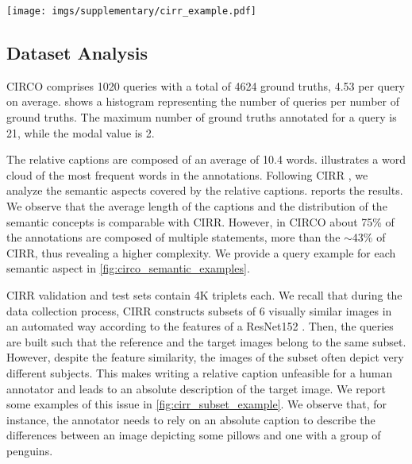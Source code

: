 \documentclass[10pt,twocolumn,letterpaper]{article}
\begin{document}
\begin{figure*}
     \centering
     \texttt{[image: imgs/supplementary/cirr\_example.pdf]}
     \caption{Examples of queries belonging to the CIRR dataset \cite{liu2021image}. The subsets of images depict very different subjects and the relative captions do not consider the reference images. We highlight the target image with a green border.}
     \label{fig:cirr_subset_example}
 \end{figure*}


\subsection{Dataset Analysis} \label{sec:dataset_analysis}
CIRCO comprises 1020 queries with a total of 4624 ground truths, 4.53 per query on average.  shows a histogram representing the number of queries per number of ground truths. The maximum number of ground truths annotated for a query is 21, while the modal value is 2. 

The relative captions are composed of an average of 10.4 words.
 illustrates a word cloud of the most frequent words in the annotations. Following CIRR \cite{liu2021image}, we analyze the semantic aspects covered by the relative captions.  reports the results. We observe that the average length of the captions and the distribution of the semantic concepts is comparable with CIRR. However, in CIRCO about 75\% of the annotations are composed of multiple statements, more than the $\sim$43\% of CIRR, thus revealing a higher complexity. We provide a query example for each semantic aspect in \cref{fig:circo_semantic_examples}.

CIRR \cite{liu2021image} validation and test sets contain 4K triplets each. We recall that during the data collection process, CIRR constructs subsets of 6 visually similar images in an automated way according to the features of a ResNet152 \cite{he2016deep}. Then, the queries are built such that the reference and the target images belong to the same subset. However, despite the feature similarity, the images of the subset often depict very different subjects. This makes writing a relative caption unfeasible for a human annotator and leads to an absolute description of the target image. We report some examples of this issue in \cref{fig:cirr_subset_example}. We observe that, for instance, the annotator needs to rely on an absolute caption to describe the differences between an image depicting some pillows and one with a group of penguins.
\end{document}
